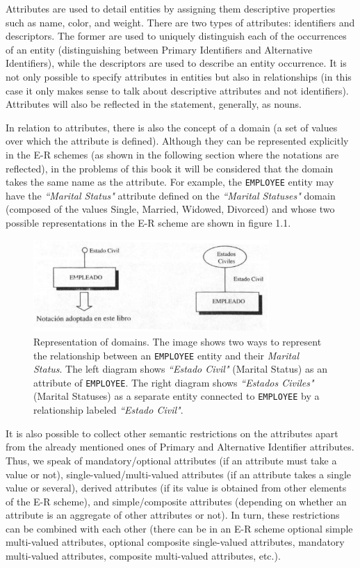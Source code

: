 \documentclass{article}
\numberwithin{figure}{section}
\begin{document}
Attributes are used to detail entities by assigning them descriptive properties such as name, color, and weight.  There are two types of attributes: identifiers and descriptors.  The former are used to uniquely distinguish each of the occurrences of an entity (distinguishing between Primary Identifiers and Alternative Identifiers), while the descriptors are used to describe an entity occurrence.  It is not only possible to specify attributes in entities but also in relationships (in this case it only makes sense to talk about descriptive attributes and not identifiers).  Attributes will also be reflected in the statement, generally, as nouns.

In relation to attributes, there is also the concept of a domain (a set of values over which the attribute is defined).  Although they can be represented explicitly in the E-R schemes (as shown in the following section where the notations are reflected), in the problems of this book it will be considered that the domain takes the same name as the attribute.  For example, the \texttt{EMPLOYEE} entity may have the \textit{``Marital Status"} attribute defined on the \textit{``Marital Statuses"} domain (composed of the values Single, Married, Widowed, Divorced) and whose two possible representations in the E-R scheme are shown in figure 1.1.

\begin{figure}
    \centering
    \includegraphics[width=0.8\textwidth]{figures/fig1}
    \caption{Representation of domains. The image shows two ways to represent the relationship between an \texttt{EMPLOYEE} entity and their \textit{Marital Status}. The left diagram shows \textit{``Estado Civil"} (Marital Status) as an attribute of \texttt{EMPLOYEE}. The right diagram shows \textit{``Estados Civiles"} (Marital Statuses) as a separate entity connected to \texttt{EMPLOYEE} by a relationship labeled \textit{``Estado Civil"}.}
    \label{fig:fig1.1}
\end{figure}

It is also possible to collect other semantic restrictions on the attributes apart from the already mentioned ones of Primary and Alternative Identifier attributes.  Thus, we speak of mandatory/optional attributes (if an attribute must take a value or not), single-valued/multi-valued attributes (if an attribute takes a single value or several), derived attributes (if its value is obtained from other elements of the E-R scheme), and simple/composite attributes (depending on whether an attribute is an aggregate of other attributes or not).  In turn, these restrictions can be combined with each other (there can be in an E-R scheme optional simple multi-valued attributes, optional composite single-valued attributes, mandatory multi-valued attributes, composite multi-valued attributes, etc.).
\end{document}
